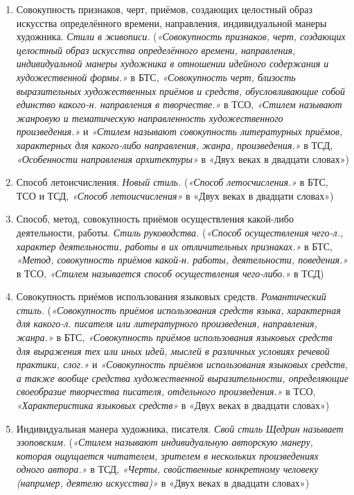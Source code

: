 \begin{enumerate}
    \item Совокупность признаков, черт, приёмов, создающих целостный образ искусства определённого времени, направления, индивидуальной манеры художника. \textit{Стили в живописи.}
(\textit{«Совокупность признаков, черт, создающих целостный образ искусства определённого времени, направления, индивидуальной манеры художника в отношении идейного содержания и художественной формы.»} в БТС,
\textit{«Совокупность черт, близость выразительных художественных приёмов и средств, обусловливающие собой единство какого-н. направления в творчестве.»} в ТСО,
\textit{«Стилем называют жанровую и тематическую направленность художественного произведения.»} и \textit{«Стилем называют совокупность литературных приёмов, характерных для какого-либо направления, жанра, произведения.»} в ТСД,
\textit{«Особенности направления архитектуры»} в «Двух веках в двадцати словах»)

    \item Способ летоисчисления. \textit{Новый стиль.}
(\textit{«Способ летосчисления.»} в БТС, ТСО и ТСД,
\textit{«Способ летоисчисления»} в «Двух веках в двадцати словах»)

    \item Способ, метод, совокупность приёмов осуществления какой-либо деятельности, работы. \textit{Стиль руководства.}
(\textit{«Способ осуществления чего-л., характер деятельности, работы в их отличительных признаках.»} в БТС,
\textit{«Метод, совокупность приёмов какой-н. работы, деятельности, поведения.»} в ТСО,
\textit{«Стилем называется способ осуществления чего-либо.»} в ТСД)

    \item Совокупность приёмов использования языковых средств. \textit{Романтический стиль.}
(\textit{«Совокупность приёмов использования средств языка, характерная для какого-л. писателя или литературного произведения, направления, жанра.»} в БТС,
\textit{«Совокупность приёмов использования языковых средств для выражения тех или иных идей, мыслей в различных условиях речевой практики, слог.»} и \textit{«Совокупность приёмов использования языковых средств, а также вообще средства художественной выразительности, определяющие своеобразие творчества писателя, отдельного произведения.»} в ТСО,
\textit{«Характеристика языковых средств»} в «Двух веках в двадцати словах»)

    \item Индивидуальная манера художника, писателя. \textit{Свой стиль Щедрин называет эзоповским.}
(\textit{«Стилем называют индивидуальную авторскую манеру, которая ощущается читателем, зрителем в нескольких произведениях одного автора.»} в ТСД,
\textit{«Черты, свойственные конкретному человеку (например, деятелю искусства)»} в «Двух веках в двадцати словах»)


\end{enumerate}
